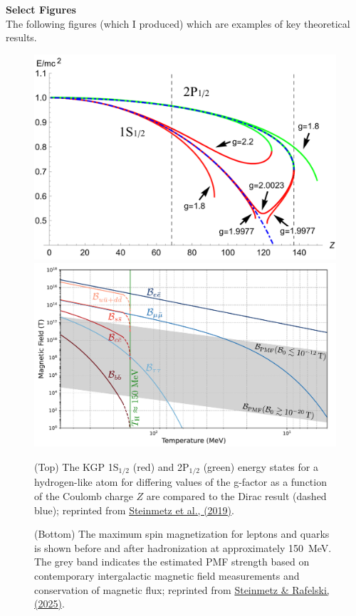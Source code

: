 \documentclass[11pt]{article}
\begin{document}
\newpage

{\noindent\Large\textbf{Select Figures}}\\
The following figures (which I produced) which are examples of key theoretical results.
\begin{figure}[h!]
    \centering
        \includegraphics[width=0.74\linewidth]{research_statements/Figure_1.pdf}\\
        \includegraphics[width=0.80\linewidth]{research_statements/Figure_2.pdf}
    \caption{(Top) The KGP 1S\(_{1/2}\) (red) and 2P\(_{1/2}\) (green) energy states for a hydrogen-like atom for differing values of the g-factor as a function of the Coulomb charge \(Z\) are compared to the Dirac result (dashed blue); reprinted from \href{https://doi.org/10.1140/epja/i2019-12715-5}{Steinmetz et al., (2019)}.}
    \label{fig:figure1}
    \caption{(Bottom) The maximum spin magnetization for leptons and quarks is shown before and after hadronization at approximately 150~MeV. The grey band indicates the estimated PMF strength based on contemporary intergalactic magnetic field measurements and conservation of magnetic flux; reprinted from \href{https://doi.org/10.48550/arXiv.2502.05052}{Steinmetz \& Rafelski, (2025)}.}
    \label{fig:figure2}
\end{figure}
\end{document}
